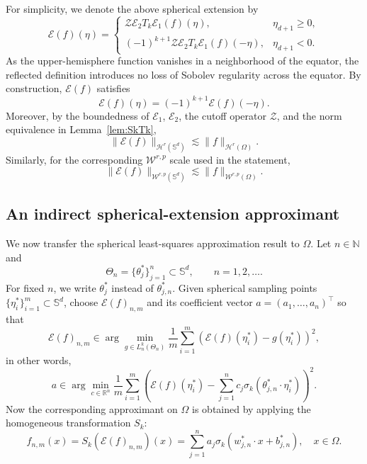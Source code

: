\documentclass{article}
\numberwithin{equation}{section}
\def\NN{\mathbb{N}}
\def\SS{\mathbb{S}}
\def\sul{\sum\limits}
\begin{document}
For simplicity, we denote the above spherical extension by
\begin{equation}\label{eq:spherical_extension}
\mathcal{E}(f)(\eta)=\begin{cases}
\mathcal Z\mathcal E_2T_k\mathcal E_1(f)(\eta),&\eta_{d+1}\ge0,\\[0.3em]
(-1)^{k+1}\mathcal Z\mathcal E_2T_k\mathcal E_1(f)(-\eta),&\eta_{d+1}<0.
\end{cases}
\end{equation}
As the upper-hemisphere function vanishes in a neighborhood of the equator, the reflected definition introduces no loss of Sobolev regularity across the equator. By construction, $\mathcal{E}(f)$ satisfies
\[
\mathcal{E}(f)(\eta)=(-1)^{k+1}\mathcal{E}(f)(-\eta).
\]
Moreover, by the boundedness of $\mathcal E_1$, $\mathcal E_2$, the cutoff operator $\mathcal Z$, and the norm equivalence in Lemma~\ref{lem:SkTk},
\begin{equation}\label{eq:extension_regular}
\|\mathcal{E}(f)\|_{\mathcal H^r(\SS^d)}\lesssim\|f\|_{\mathcal H^r(\Omega)}.
\end{equation}
Similarly, for the corresponding $\mathcal{W}^{r,p}$ scale used in the statement,
\[
\|\mathcal{E}(f)\|_{\mathcal W^{r,p}(\SS^d)}\lesssim\|f\|_{\mathcal W^{r,p}(\Omega)}.
\]


\subsection{An indirect spherical-extension approximant}

We now transfer the spherical least-squares approximation result to
$\Omega$. Let $n\in\NN$ and
\[
\Theta_n=\{\theta_{j}^*\}_{j=1}^n\subset\mathbb S^d,\qquad n=1,2,\dots.
\]
For fixed $n$, we write $\theta_j^*$ instead of $\theta_{j,n}^*$.
Given spherical sampling points
$\{\eta_i^*\}_{i=1}^m\subset\mathbb S^d$,
choose $\mathcal{E}(f)_{n,m}$ and its coefficient vector $a=(a_1,\ldots,a_n)^\top$ so that
\begin{equation*}
    \mathcal{E}(f)_{n,m}\in\arg\min\limits_{g\in L_n^k(\Theta_n)}\frac{1}{m}\sum_{i=1}^m\left(
\mathcal{E}(f)(\eta_i^*)
-
g(\eta_i^*)
\right)^2,
\end{equation*}
in other words,
\begin{equation*}
a\in
\arg\min_{c\in\mathbb R^n}
\frac1m
\sum_{i=1}^m
\left(
\mathcal{E}(f)(\eta_i^*)
-
\sum_{j=1}^n
c_j\sigma_k(\theta_{j,n}^*\cdot\eta_i^*)
\right)^2 .
\end{equation*}
Now the corresponding approximant on $\Omega$ is obtained by applying the homogeneous transformation $S_k$:
\begin{equation}\label{eqn_dls_domain}
    f_{n,m}(x)=S_k(\mathcal E(f)_{n,m})(x)
=\sul_{j=1}^na_j\sigma_k(w_{j,n}^*\cdot x+b_{j,n}^*),\quad x\in\Omega.
\end{equation}
\end{document}
